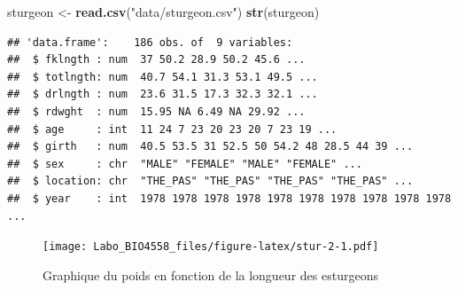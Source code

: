 \documentclass[12pt,]{book}
\newenvironment{Shaded}{\begin{snugshade}}{\end{snugshade}}
\newcommand{\CommentTok}[1]{\textcolor[rgb]{0.56,0.35,0.01}{\textit{#1}}}
\newcommand{\DataTypeTok}[1]{\textcolor[rgb]{0.13,0.29,0.53}{#1}}
\newcommand{\KeywordTok}[1]{\textcolor[rgb]{0.13,0.29,0.53}{\textbf{#1}}}
\newcommand{\NormalTok}[1]{#1}
\newcommand{\OperatorTok}[1]{\textcolor[rgb]{0.81,0.36,0.00}{\textbf{#1}}}
\newcommand{\OtherTok}[1]{\textcolor[rgb]{0.56,0.35,0.01}{#1}}
\newcommand{\StringTok}[1]{\textcolor[rgb]{0.31,0.60,0.02}{#1}}
\begin{document}
\begin{Shaded}
\begin{Highlighting}[]
\NormalTok{sturgeon <-}\StringTok{ }\KeywordTok{read.csv}\NormalTok{(}\StringTok{"data/sturgeon.csv"}\NormalTok{)}
\KeywordTok{str}\NormalTok{(sturgeon)}
\end{Highlighting}
\end{Shaded}

\begin{verbatim}
## 'data.frame':    186 obs. of  9 variables:
##  $ fklngth : num  37 50.2 28.9 50.2 45.6 ...
##  $ totlngth: num  40.7 54.1 31.3 53.1 49.5 ...
##  $ drlngth : num  23.6 31.5 17.3 32.3 32.1 ...
##  $ rdwght  : num  15.95 NA 6.49 NA 29.92 ...
##  $ age     : int  11 24 7 23 20 23 20 7 23 19 ...
##  $ girth   : num  40.5 53.5 31 52.5 50 54.2 48 28.5 44 39 ...
##  $ sex     : chr  "MALE" "FEMALE" "MALE" "FEMALE" ...
##  $ location: chr  "THE_PAS" "THE_PAS" "THE_PAS" "THE_PAS" ...
##  $ year    : int  1978 1978 1978 1978 1978 1978 1978 1978 1978 1978 ...
\end{verbatim}

\begin{Shaded}
\end{Shaded}

\begin{figure}
\centering
\texttt{[image: Labo\_BIO4558\_files/figure-latex/stur-2-1.pdf]}
\caption{\label{fig:stur-2}Graphique du poids en fonction de la longueur des esturgeons}
\end{figure}
\end{document}
